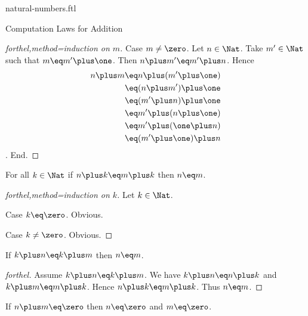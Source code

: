 \documentclass{naproche-library}
\begin{document}
\begin{smodule}[title=Natural Numbers]{natural-numbers.ftl}
\begin{sfragment}{Computation Laws for Addition}
\begin{proof}[forthel,method=induction on $m$]
    Case $m\neq\zero$.
      Let $n\in\Nat$.
      Take $m'\in\Nat$ such that $m\eq m'\plus\one$.
      Then $n\plus m'\eq m'\plus n$.
      Hence
      \begin{align*}
        n\plus m
          &\eq n\plus(m'\plus\one)\\
          &\eq (n\plus m')\plus\one\\
          &\eq (m'\plus n)\plus\one\\
          &\eq m'\plus(n\plus\one)\\
          &\eq m'\plus(\one\plus n)\\
          &\eq (m'\plus\one)\plus n
      \end{align*}.
    End.
  \end{proof}

  \begin{proposition}[forthel,title=Right cancellation,id=PlusIsRightCancellativeProp]
    For all $k\in\Nat$ if $n\plus k\eq m\plus k$ then $n\eq m$.
  \end{proposition}
  \begin{proof}[forthel,method=induction on $k$]
    Let $k\in\Nat$.

    Case $k\eq\zero$. Obvious.

    Case $k\neq\zero$. Obvious.
  \end{proof}

  \begin{corollary}[forthel,title=Left cancellation,id=PlusIsLeftCancellativeProp]
    If $k\plus n\eq k\plus m$ then $n\eq m$.
  \end{corollary}
  \begin{proof}[forthel]
    Assume $k\plus n\eq k\plus m$.
    We have $k\plus n\eq n\plus k$ and $k\plus m\eq m\plus k$.
    Hence $n\plus k\eq m\plus k$.
    Thus $n\eq m$.
  \end{proof}

  \begin{proposition}[forthel,id=ZeroSumImpliesZeroSummandsProp]
    If $n\plus m\eq\zero$ then $n\eq\zero$ and $m\eq\zero$.
  \end{proposition}
\end{sfragment}
\end{smodule}
\end{document}
